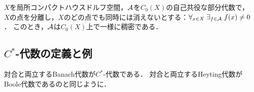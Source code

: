 \documentclass[uplatex,dvipdfmx]{jsreport}
\begin{document}
\begin{corollary}
    $X$を局所コンパクトハウスドルフ空間，$\mathcal{A}$を$C_0(X)$の自己共役な部分代数で，$X$の点を分離し，$X$のどの点でも同時には消えないとする：$\forall_{x\in X}\;\exists_{f\in\mathcal{A}}\;f(x)\ne0$．
    このとき，$\mathcal{A}$は$C_0(X)$上で一様に稠密である．
\end{corollary}

\subsection{$C^*$-代数の定義と例}

\begin{tcolorbox}[colframe=ForestGreen, colback=ForestGreen!10!white,breakable,colbacktitle=ForestGreen!40!white,coltitle=black,fonttitle=\bfseries\sffamily,
title=]
    対合と両立するBanach代数が$C^*$-代数である．
    対合と両立するHeyting代数がBoole代数であるのと同じように．
\end{tcolorbox}
\end{document}
